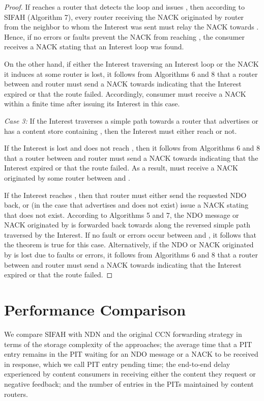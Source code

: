 \documentclass{ancs15-alternate}
\begin{document}
\begin{proof}
If  reaches a router  that detects the loop and issues  ,  then
according to SIFAH (Algorithm 7), every router receiving the NACK  originated by router  from the neighbor to whom the Interest was sent must relay 
the NACK towards . Hence, if no errors or faults prevent the NACK from reaching , the consumer receives a NACK stating that an Interest loop was found.

On the other hand, if either the Interest traversing an Interest loop or the NACK it induces at some router  is lost, it follows from Algorithms 6 and 8 that a router between  and  router  must send a NACK towards  indicating  that the Interest expired or that the route failed. Accordingly,  consumer  must receive a NACK within a finite time after issuing its Interest in this case.

{\em Case 3:} If the Interest  traverses a simple path towards a router  that advertises  or has a content store containing , then the Interest must either reach  or not. 

If the Interest is lost and does not reach , then it follows from Algorithms 6 and 8 that a router between  and router   must send a NACK towards  indicating  that the Interest expired or that the route failed. As a result,  must receive a NACK originated by some router between  and .

If the Interest reaches , then that router must either send the requested NDO back, or (in the case that  advertises  and  does not exist) issue a NACK stating that 
 does not exist. According to Algorithms 5 and 7, the NDO message or NACK originated by  is forwarded back towards  along the reversed simple path traversed by the Interest.  If no fault or errors occur between  and , it follows that the theorem is true for this case. Alternatively, if the NDO or NACK originated by  is lost due to faults or errors, it follows from  Algorithms 6 and 8 that a router between  and  router  must send a NACK towards  indicating  that the Interest expired or that the route failed. 
\end{proof}


\section{Performance Comparison}
\label{sec-perf}

We compare SIFAH with NDN and the original CCN forwarding strategy in terms of the storage complexity of the approaches;
the average time that a PIT entry remains in the PIT waiting for an NDO message or a NACK to be received in response, which we call PIT entry pending time; the end-to-end delay experienced by content consumers in receiving either the content they request or negative feedback; and the number of entries in the PITs maintained by content routers.
\end{document}
